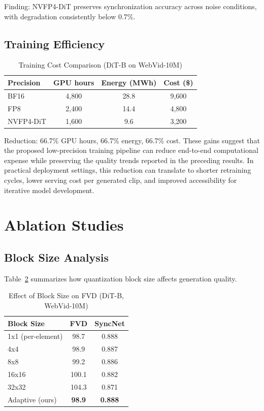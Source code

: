 \documentclass[journal,twoside]{IEEEtran}
\theoremstyle{definition}
\theoremstyle{remark}
\begin{document}
Finding: NVFP4-DiT preserves synchronization accuracy across noise conditions, with degradation consistently below 0.7\%.

\FloatBarrier
\subsection{Training Efficiency}

\begin{table}[H]
\centering
\caption{Training Cost Comparison (DiT-B on WebVid-10M)}
\label{tab:training_cost}
\begin{tabular}{lccc}
\toprule
Precision & GPU hours & Energy (MWh) & Cost (\$) \\
\midrule
BF16 & 4,800 & 28.8 & 9,600 \\
FP8 & 2,400 & 14.4 & 4,800 \\
NVFP4-DiT & 1,600 & 9.6 & 3,200 \\
\bottomrule
\end{tabular}
\end{table}

Reduction: 66.7\% GPU hours, 66.7\% energy, 66.7\% cost. These gains suggest that the proposed low-precision training pipeline can reduce end-to-end computational expense while preserving the quality trends reported in the preceding results. In practical deployment settings, this reduction can translate to shorter retraining cycles, lower serving cost per generated clip, and improved accessibility for iterative model development.

\section{Ablation Studies}
\label{sec:ablation}

\subsection{Block Size Analysis}

Table~\ref{tab:block_size} summarizes how quantization block size affects generation quality.

\begin{table}[H]
\centering
\caption{Effect of Block Size on FVD (DiT-B, WebVid-10M)}
\label{tab:block_size}
\begin{tabular}{lcc}
\hline
Block Size & FVD & SyncNet \\
\hline
1x1 (per-element) & 98.7 & 0.888 \\
4x4 & 98.9 & 0.887 \\
8x8 & 99.2 & 0.886 \\
16x16 & 100.1 & 0.882 \\
32x32 & 104.3 & 0.871 \\
Adaptive (ours) & \textbf{98.9} & \textbf{0.888} \\
\hline
\end{tabular}
\end{table}
\end{document}
